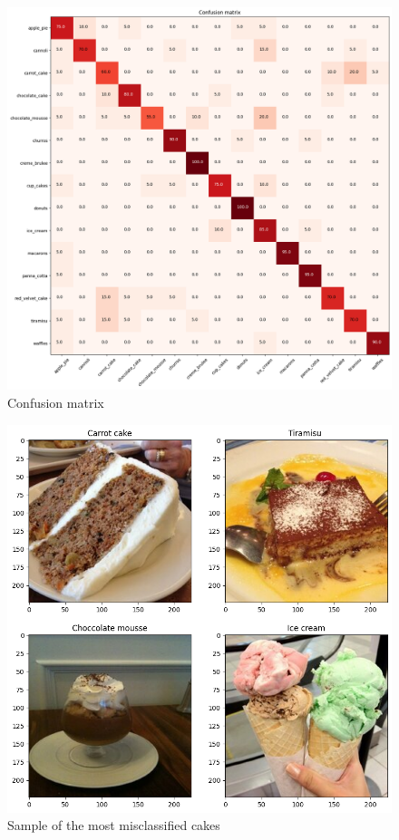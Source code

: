 \documentclass{class}
\begin{document}
\begin{figure}[h]
    \centering
    \includegraphics[width=\columnwidth]{images/2.2_confusion_matrix.png}
    \caption{Confusion matrix}
    \label{fig-4}
\end{figure}

\begin{figure}[h]
    \centering
    \includegraphics[width=.9\columnwidth]{images/2.2_sample_missclassified_cakes.png}
    \caption{Sample of the most misclassified cakes}
    \label{fig-5}
\end{figure}
\end{document}
